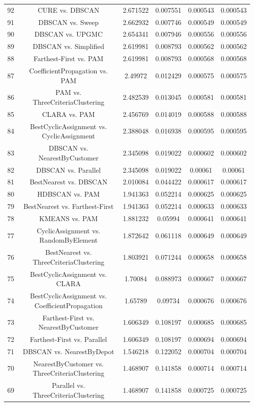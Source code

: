 \documentclass[a4paper,10pt]{article}
\begin{document}
\begin{landscape}
\begin{table}[!htp]
\begin{tabular}{cccccc}
92&CURE vs. DBSCAN&2.671522&0.007551&0.000543&0.000543\\
91&DBSCAN vs. Sweep&2.662932&0.007746&0.000549&0.000549\\
90&DBSCAN vs. UPGMC&2.654341&0.007946&0.000556&0.000556\\
89&DBSCAN vs. Simplified&2.619981&0.008793&0.000562&0.000562\\
88&Farthest-First vs. PAM&2.619981&0.008793&0.000568&0.000568\\
87&CoefficientPropagation vs. PAM&2.49972&0.012429&0.000575&0.000575\\
86&PAM vs. ThreeCriteriaClustering&2.482539&0.013045&0.000581&0.000581\\
85&CLARA vs. PAM&2.456769&0.014019&0.000588&0.000588\\
84&BestCyclicAssignment vs. CyclicAssignment&2.388048&0.016938&0.000595&0.000595\\
83&DBSCAN vs. NearestByCustomer&2.345098&0.019022&0.000602&0.000602\\
82&DBSCAN vs. Parallel&2.345098&0.019022&0.00061&0.00061\\
81&BestNearest vs. DBSCAN&2.010084&0.044422&0.000617&0.000617\\
80&HDBSCAN vs. PAM&1.941363&0.052214&0.000625&0.000625\\
79&BestNearest vs. Farthest-First&1.941363&0.052214&0.000633&0.000633\\
78&KMEANS vs. PAM&1.881232&0.05994&0.000641&0.000641\\
77&CyclicAssignment vs. RandomByElement&1.872642&0.061118&0.000649&0.000649\\
76&BestNearest vs. ThreeCriteriaClustering&1.803921&0.071244&0.000658&0.000658\\
75&BestCyclicAssignment vs. CLARA&1.70084&0.088973&0.000667&0.000667\\
74&BestCyclicAssignment vs. CoefficientPropagation&1.65789&0.09734&0.000676&0.000676\\
73&Farthest-First vs. NearestByCustomer&1.606349&0.108197&0.000685&0.000685\\
72&Farthest-First vs. Parallel&1.606349&0.108197&0.000694&0.000694\\
71&DBSCAN vs. NearestByDepot&1.546218&0.122052&0.000704&0.000704\\
70&NearestByCustomer vs. ThreeCriteriaClustering&1.468907&0.141858&0.000714&0.000714\\
69&Parallel vs. ThreeCriteriaClustering&1.468907&0.141858&0.000725&0.000725\\

\end{tabular}
\end{table}
\end{landscape}
\end{document}
